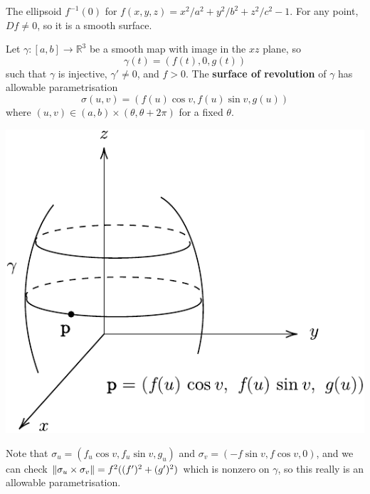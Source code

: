 \documentclass[a4paper]{article}
\begin{document}
\begin{example}
	The ellipsoid \( f^{-1}(0) \) for \( f(x,y,z) = x^2/a^2 + y^2/b^2 + z^2/c^2 - 1 \).
	For any point, \( Df \neq 0 \), so it is a smooth surface.
\end{example}
\begin{example}
	Let \( \gamma \colon [a,b] \to \mathbb R^3 \) be a smooth map with image in the \( xz \) plane, so
	\[
		\gamma(t) = (f(t), 0, g(t))
	\]
	such that \( \gamma \) is injective, \( \gamma' \neq 0 \), and \( f > 0 \).
	The \textbf{surface of revolution} of \( \gamma \) has allowable parametrisation
	\[
		\sigma(u,v) = (f(u)\cos v, f(u)\sin v, g(u))
	\]
	where \( (u,v) \in (a,b) \times (\theta, \theta + 2\pi) \) for a fixed \( \theta \).
	\begin{center}
	\includegraphics[scale=0.8]{SoR}
	\end{center}
	Note that \( \sigma_u = (f_u \cos v, f_u \sin v, g_u) \) and \( \sigma_v = (-f\sin v, f \cos v, 0) \), and we can check \( \norm{\sigma_u \times \sigma_v} = f^2 ((f')^2 + (g')^2) \) which is nonzero on \( \gamma \), so this really is an allowable parametrisation.
\end{example}
\end{document}
